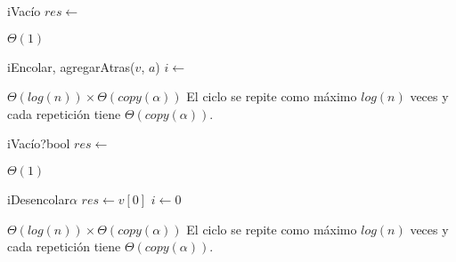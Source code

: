 \begin{Algoritmos}


  \begin{algoritmo}{iVac\'io}{}{}
    $res \gets$ \vacia{} 
  \end{algoritmo}
  \datosAlgoritmo{} %
  {} %
  {} %
  {$\Theta(1)$} %
  {} %

  \begin{algoritmo}{iEncolar}{, }{}
    agregarAtras($v$, $a$) 
     $i \gets$  
  \end{algoritmo}
  \datosAlgoritmo{} %
  {} %
  {} %
  {$\Theta(log(n)) \times \Theta(copy(\alpha))$} %
  {El ciclo se repite como m\'aximo $log(n)$ veces y cada repetici\'on tiene $\Theta(copy(\alpha))$. } %

  \begin{algoritmo}{iVac\'{i}o?}{}{bool}
    $res \gets$  
  \end{algoritmo}
  \datosAlgoritmo{} %
  {} %
  {} %
  {$\Theta(1)$} %
  {} %

  \begin{algoritmo}{iDesencolar}{}{$\alpha$}
    $res \gets v[0]$ 
     $i \gets 0$ 
  \end{algoritmo}
  \datosAlgoritmo{} %
  {} %
  {} %
  {$\Theta(log(n)) \times \Theta(copy(\alpha))$} %
  {El ciclo se repite como m\'aximo $log(n)$ veces y cada repetici\'on tiene $\Theta(copy(\alpha))$. } %


\end{Algoritmos}
